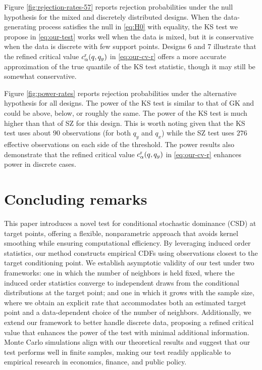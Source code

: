 \documentclass[11pt]{article}
\numberwithin{equation}{section}
\begin{document}
Figure \ref{fig:rejection-rates-57} reports rejection probabilities under the null hypothesis for the mixed and discretely distributed designs. When the data-generating process satisfies the null in \eqref{eq:H0} with equality, the KS test we propose in \eqref{eq:our-test} works well when the data is mixed, but it is conservative when the data is discrete with few support points. Designs 6 and 7 illustrate that the refined critical value \(c^{\rm r}_{\alpha}(q, q_y)\) in \eqref{eq:our-cv-r} offers a more accurate approximation of the true quantile of the KS test statistic, though it may still be somewhat conservative. 

Figure \ref{fig:power-rates} reports rejection probabilities under the alternative hypothesis for all designs. The power of the KS test is similar to that of GK and could be above, below, or roughly the same. The power of the KS test is much higher than that of SZ for this design. This is worth noting given that the KS test uses about $90$ observations (for both $q_y$ and $q_x$) while the SZ test uses $276$ effective observations on each side of the threshold. The power results also demonstrate that the refined critical value \(c^{\rm r}_{\alpha}(q, q_y)\) in \eqref{eq:our-cv-r} enhances power in discrete cases. 

\section{Concluding remarks}\label{sec:conclusion}

This paper introduces a novel test for conditional stochastic dominance (CSD) at target points, offering a flexible, nonparametric approach that avoids kernel smoothing while ensuring computational efficiency. By leveraging induced order statistics, our method constructs empirical CDFs using observations closest to the target conditioning point. 
We establish asymptotic validity of our test under two frameworks: one in which the number of neighbors is held fixed, where the induced order statistics converge to independent draws from the conditional distributions at the target point; and one in which it grows with the sample size, where we obtain an explicit rate that accommodates both an estimated target point and a data-dependent choice of the number of neighbors. Additionally, we extend our framework to better handle discrete data, proposing a refined critical value that enhances the power of the test with minimal additional information. Monte Carlo simulations align with our theoretical results and suggest that our test performs well in finite samples, making our test readily applicable to empirical research in economics, finance, and public policy.
\end{document}

